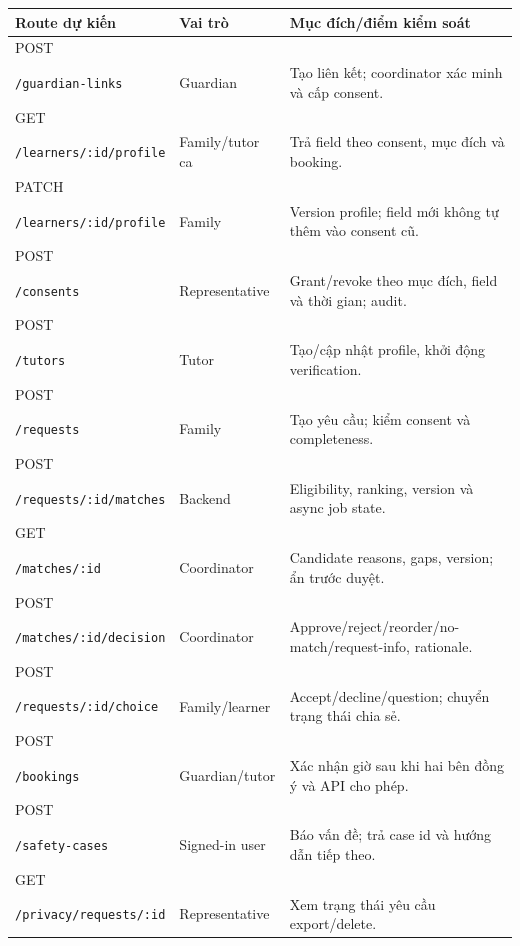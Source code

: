 \documentclass[11pt,a4paper]{article}
\begin{document}
\begin{tabularx}{\textwidth}{p{4.9cm}p{2.7cm}Y}
\toprule
\textbf{Route dự kiến} & \textbf{Vai trò} & \textbf{Mục đích/điểm kiểm soát} \\
\midrule
POST\\\texttt{/guardian-links} & Guardian & Tạo liên kết; coordinator xác minh và cấp consent. \\
GET\\\texttt{/learners/:id/profile} & Family/tutor ca & Trả field theo consent, mục đích và booking. \\
PATCH\\\texttt{/learners/:id/profile} & Family & Version profile; field mới không tự thêm vào consent cũ. \\
POST\\\texttt{/consents} & Representative & Grant/revoke theo mục đích, field và thời gian; audit. \\
POST\\\texttt{/tutors} & Tutor & Tạo/cập nhật profile, khởi động verification. \\
POST\\\texttt{/requests} & Family & Tạo yêu cầu; kiểm consent và completeness. \\
POST\\\texttt{/requests/:id/matches} & Backend & Eligibility, ranking, version và async job state. \\
GET\\\texttt{/matches/:id} & Coordinator & Candidate reasons, gaps, version; ẩn trước duyệt. \\
POST\\\texttt{/matches/:id/decision} & Coordinator & Approve/reject/reorder/no-match/request-info, rationale. \\
POST\\\texttt{/requests/:id/choice} & Family/learner & Accept/decline/question; chuyển trạng thái chia sẻ. \\
POST\\\texttt{/bookings} & Guardian/tutor & Xác nhận giờ sau khi hai bên đồng ý và API cho phép. \\
POST\\\texttt{/safety-cases} & Signed-in user & Báo vấn đề; trả case id và hướng dẫn tiếp theo. \\
GET\\\texttt{/privacy/requests/:id} & Representative & Xem trạng thái yêu cầu export/delete. \\
\bottomrule
\end{tabularx}
\end{document}
